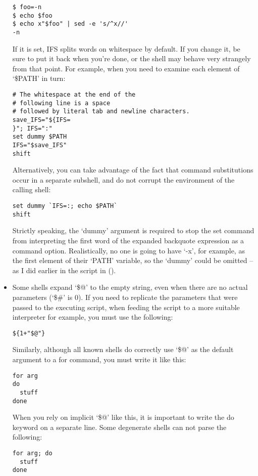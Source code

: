 \begin{itemize}
\begin{Verbatim}[frame=single]
$ foo=-n
$ echo $foo
$ echo x"$foo" | sed -e 's/^x//'
-n
\end{Verbatim}

If it is set, IFS splits words on whitespace by default. If you change it, be sure to put it back when you're done, or the shell may behave very strangely from that point. For example, when you need to examine each element of `\$PATH' in turn:

\begin{Verbatim}[frame=single]
# The whitespace at the end of the 
# following line is a space
# followed by literal tab and newline characters.
save_IFS="${IFS= 	
}"; IFS=":"
set dummy $PATH
IFS="$save_IFS"
shift
\end{Verbatim}

Alternatively, you can take advantage of the fact that command substitutions occur in a separate subshell, and do not corrupt the environment of the calling shell:

\begin{Verbatim}[frame=single]
set dummy `IFS=:; echo $PATH`
shift
\end{Verbatim}

Strictly speaking, the `dummy' argument is required to stop the set command from interpreting the first word of the expanded backquote expression as a command option. Realistically, no one is going to have `-x', for example, as the first element of their `PATH' variable, so the `dummy' could be omitted -- as I did earlier in the script in ().

\item Some shells expand `\$@' to the empty string, even when there are no 
actual parameters (`\$\#' is 0). If you need to replicate the parameters that 
were passed to the executing script, when feeding the script to a more 
suitable interpreter for example, you must use the following:

\begin{Verbatim}[frame=single]
${1+"$@"}
\end{Verbatim}

Similarly, although all known shells do correctly use `\$@' as the default argument to a for command, you must write it like this:

\begin{Verbatim}[frame=single]
for arg
do
  stuff
done
\end{Verbatim}

When you rely on implicit `\$@' like this, it is important to write the do keyword on a separate line. Some degenerate shells can not parse the following:

\begin{Verbatim}[frame=single]
for arg; do
  stuff
done
\end{Verbatim}

\end{itemize}

